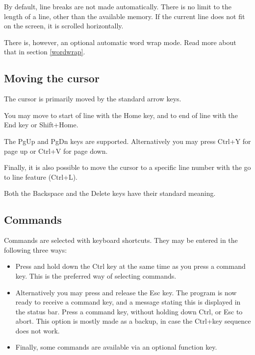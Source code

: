 \documentclass{article}
\begin{document}
        By default, line breaks are not made automatically. There is no limit
        to the length of a line, other than the available memory. If 
        the current line does not fit on the screen, it is 
        scrolled horizontally. 
        
        There is, however, an optional automatic 
        word wrap mode. Read more about that in section \ref{wordwrap}.
       
    \subsection{Moving the cursor}

        The cursor is primarily moved by the standard arrow keys.

        You may move to start of line with the Home key, and to end of line with the End key or Shift+Home.

        The PgUp and PgDn keys are supported. Alternatively you may press
        Ctrl+Y for page up or Ctrl+V for page down.

        Finally, it is also possible to move the cursor to a specific line number 
        with the go to line feature (Ctrl+L).

        Both the Backspace and the Delete keys have their standard meaning.

    \subsection{Commands}
    \label{commands}
    
        Commands are selected with keyboard shortcuts. They may be entered in the following three ways:

        \begin{itemize}

            \item Press and hold down the Ctrl key at the same time as you press a command key. This is the
            preferred way of selecting commands.
            
            \item Alternatively you may press and release the Esc key. The program is now ready to receive
            a command key, and a message stating this is displayed in the status bar. 
            Press a command key, without holding down Ctrl, or Esc to abort. This option is mostly
            made as a backup, in case the Ctrl+key sequence does not work. 
            
            \item Finally, some commands are available via an optional function key.
        \end{itemize}
\end{document}

